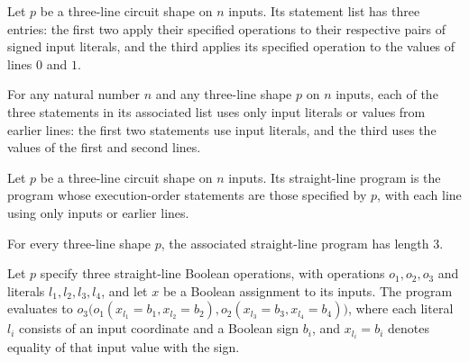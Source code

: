 \begin{definition}
\label{BoolCircuit.Shape3.stmts}
\leanok
{}
Let $p$ be a three-line circuit shape on $n$ inputs. Its statement list has three
entries: the first two apply their specified operations to their respective pairs of
signed input literals, and the third applies its specified operation to the values of
lines $0$ and $1$.
\end{definition}

\begin{theorem}
\label{BoolCircuit.Shape3.valid}
\leanok
{}
For any natural number $n$ and any three-line shape $p$ on $n$ inputs, each of the three
statements in its associated list uses only input literals or values from earlier lines:
the first two statements use input literals, and the third uses the values of the first
and second lines.
\end{theorem}

\begin{definition}
\label{BoolCircuit.Shape3.prog}
\leanok
{}
Let $p$ be a three-line circuit shape on $n$ inputs. Its straight-line program is the
program whose execution-order statements are those specified by $p$, with each line
using only inputs or earlier lines.
\end{definition}

\begin{theorem}
\label{BoolCircuit.Shape3.prog_length}
\leanok
{}
For every three-line shape $p$, the associated straight-line program has length $3$.
\end{theorem}

\begin{theorem}
\label{BoolCircuit.Shape3.prog_eval}
\leanok
{}
Let $p$ specify three straight-line Boolean operations, with operations $o_1,o_2,o_3$
and literals $l_1,l_2,l_3,l_4$, and let $x$ be a Boolean assignment to its inputs. The
program evaluates to
$o_3\bigl(o_1(x_{l_1}=b_1,x_{l_2}=b_2),o_2(x_{l_3}=b_3,x_{l_4}=b_4)\bigr)$, where each
literal $l_i$ consists of an input coordinate and a Boolean sign $b_i$, and
$x_{l_i}=b_i$ denotes equality of that input value with the sign.
\end{theorem}

